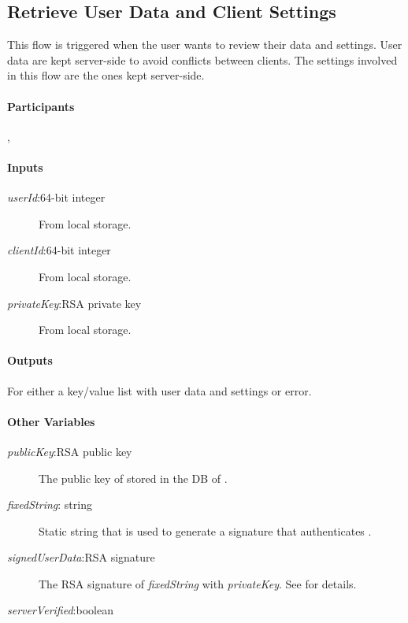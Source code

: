\documentclass[a4paper,10pt,draft]{article}
\newcommand{\signedUserData}{\emph{signedUserData}}
\newcommand{\serverVerified}{\emph{serverVerified}}
\newcommand{\privateKey}{\emph{privateKey}}
\newcommand{\publicKey}{\emph{publicKey}}
\newcommand{\userId}{\emph{userId}}
\newcommand{\clientId}{\emph{clientId}}
\newcommand{\fixedString}{\emph{fixedString}}
\begin{document}
\subsection{Retrieve User Data and Client Settings}
\label{retrieve_user_data_flow}
This flow is triggered when the user wants to review their data and settings. 
User data are kept server-side to avoid conflicts between clients. The settings 
involved in this flow are the ones kept server-side.

\paragraph{Participants} \Client{}, \Server{}

\paragraph{Inputs}
\SpecialItem
\begin{description}
 \item[\userId{}:64-bit integer] From \Client{} local storage.
 \item[\clientId{}:64-bit integer] From \Client{} local storage.
 \item[\privateKey{}:RSA private key] From \Client{} local storage.
\end{description}

\paragraph{Outputs}
\SpecialItem
For \Client{} either a key/value list with user data and settings or error.

\paragraph{Other Variables}
\SpecialItem
\begin{description}
 \item[\publicKey{}:RSA public key] The public key of \Client{} stored in the 
DB of \Server{}.
 \item[\fixedString{}: string] Static string that is used to generate a 
signature that authenticates \Client{}.
 \item[\signedUserData{}:RSA signature] The RSA signature of \fixedString{}
with \privateKey{}. See \cite{crypto_spec} for details.
 \item[\serverVerified{}:boolean]
\end{description}
\end{document}
